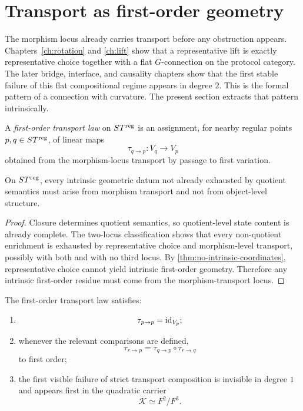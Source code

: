 \section{Transport as first-order geometry}
\label{sec:transport-first-order}
The morphism locus already carries transport before any obstruction
appears.  Chapters~\ref{ch:rotation} and \ref{ch:lift} show that a
representative lift is exactly representative choice together with a
flat \(G\)-connection on the protocol category.  The later bridge,
interface, and causality chapters show that the first stable failure of
this flat compositional regime appears in degree \(2\).
This is the formal pattern of a connection with curvature.  The present
section extracts that pattern intrinsically.
\begin{definition}
	A \emph{first-order transport law} on \(ST^{\mathrm{reg}}\) is an assignment,
	for nearby regular points \(p,q\in ST^{\mathrm{reg}}\), of linear maps
	\[
		\tau_{q\to p}:V_q\to V_p
	\]
	obtained from the morphism-locus transport by passage to first
	variation.
\end{definition}
\begin{proposition}
	\label{prop:connection-transport-unique}
	On \(ST^{\mathrm{reg}}\), every intrinsic geometric datum not already exhausted
	by quotient semantics must arise from morphism transport and not from
	object-level structure.
\end{proposition}
\begin{proof}
	Closure determines quotient semantics, so quotient-level state
	content is already complete.
	The two-locus classification shows that every non-quotient
	enrichment is exhausted by representative choice and morphism-level
	transport, possibly with both and with no third locus.
	By \cref{thm:no-intrinsic-coordinates}, representative choice cannot
	yield intrinsic first-order geometry.
	Therefore any intrinsic first-order residue must come from the
	morphism-transport locus.
\end{proof}
\begin{proposition}
	\label{prop:connection-functoriality}
	The first-order transport law satisfies:
	\begin{enumerate}[label=\textup{(\roman*)}]
		\item
		      \[
			      \tau_{p\to p}=\operatorname{id}_{V_p};
		      \]
		\item
		      whenever the relevant comparisons are defined,
		      \[
			      \tau_{r\to p}
			      =
			      \tau_{q\to p}\circ\tau_{r\to q}
		      \]
		      to first order;
		\item
		      the first visible failure of strict transport composition is invisible
		      in degree \(1\) and appears first in the quadratic carrier
		      \[
			      \mathcal K\simeq F^2/F^3.
		      \]
	\end{enumerate}
\end{proposition}
